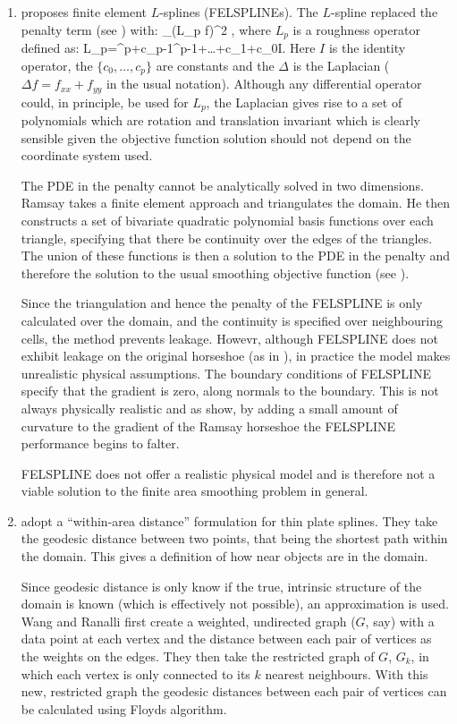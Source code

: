 \begin{enumerate}
\item \cite{ramsay} proposes finite element $L$-splines (FELSPLINEs). The $L$-spline replaced the penalty term (see ) with:
\be
\int_\Omega (L_p f)^2 \Omega,
\ee
where $L_p$ is a roughness operator defined as:
\be
L_p=\Delta^p+c_{p-1}\Delta^{p-1}+\dots+c_1\Delta+c_0I.
\ee
Here $I$ is the identity operator, the $\{c_0,\dots, c_p\}$ are constants and the $\Delta$ is the Laplacian ($\Delta f = f_{xx}+f_{yy}$ in the usual notation). Although any differential operator could, in principle, be used for $L_p$, the Laplacian gives rise to a set of polynomials which are rotation and translation invariant which is clearly sensible given the objective function solution should not depend on the coordinate system used.

The PDE in the penalty cannot be analytically solved in two dimensions. Ramsay takes a finite element approach and triangulates the domain. He then constructs a set of bivariate quadratic polynomial basis functions over each triangle, specifying that there be continuity over the edges of the triangles. The union of these functions is then a solution to the PDE in the penalty and therefore the solution to the usual smoothing objective function (see ).

Since the triangulation and hence the penalty of the FELSPLINE is only calculated over the domain, and the continuity is specified over neighbouring cells, the method prevents leakage. Howevr, although FELSPLINE does not exhibit leakage on the original horseshoe (as in ), in practice the model makes unrealistic physical assumptions. The boundary conditions of FELSPLINE specify that the gradient is zero, along normals to the boundary. This is not always physically realistic and as \cite{soap} show, by adding a small amount of curvature to the gradient of the Ramsay horseshoe the FELSPLINE performance begins to falter.

FELSPLINE does not offer a realistic physical model and is therefore not a viable solution to the finite area smoothing problem in general.

\item \cite{wangranalli} adopt a ``within-area distance'' formulation for thin plate splines. They take the geodesic distance between two points, that being the shortest path within the domain. This gives a definition of how near objects are in the domain. 

Since geodesic distance is only know if the true, intrinsic structure of the domain is known (which is effectively not possible), an approximation is used. Wang and Ranalli first create a weighted, undirected graph ($G$, say) with a data point at each vertex and the distance between each pair of vertices as the weights on the edges. They then take the restricted graph of $G$, $G_k$, in which each vertex is only connected to its $k$ nearest neighbours. With this new, restricted graph the geodesic distances between each pair of vertices can be calculated using Floyds algorithm.


\end{enumerate}
